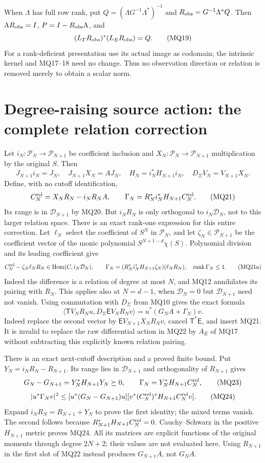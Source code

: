 \documentclass[11pt]{article}
\newcommand{\DD}{\mathcal D}
\newcommand{\TT}{\mathsf T}
\newcommand{\EE}{\mathsf E}
\begin{document}
When $\Lambda$ has full row rank, put
$Q=(\Lambda G^{-1}\Lambda^*)^{-1}$ and
$R_{\rm obs}=G^{-1}\Lambda^*Q$. Then
$\Lambda R_{\rm obs}=I$, $P=I-R_{\rm obs}\Lambda$, and
\[
 (L_TR_{\rm obs})^*(L_ER_{\rm obs})=Q.                      \tag{MQ19}
\]
For a rank-deficient presentation use its actual image as codomain;
the intrinsic kernel and MQ17--18 need no change. Thus no observation
direction or relation is removed merely to obtain a scalar norm.

\section{Degree-raising source action: the complete relation correction}
Let $i_N:\mathcal P_N\to\mathcal P_{N+1}$ be coefficient inclusion
and $X_N:\mathcal P_N\to\mathcal P_{N+1}$ multiplication by the
original $S$. Then
\[
 J_{N+1}i_N=J_N,\quad J_{N+1}X_N=AJ_N,\quad
 H_N=i_N^*H_{N+1}i_N,\quad D_\Sigma V_N=V_{N+1}X_N.         \tag{MQ20}
\]
Define, with no cutoff identification,
\[
 C_N^{\rm rel}=X_NR_N-i_NR_NA,\qquad
 \Gamma_N=R_N^*i_N^*H_{N+1}C_N^{\rm rel}.                  \tag{MQ21}
\]
Its range is in $\DD_{N+1}$ by MQ20. But $i_NR_N$ is only
orthogonal to $i_N\DD_N$, not to this larger relation space.
There is an exact rank-one expression for this entire correction.
Let $\ell_N$ select the coefficient of $S^N$ in $\mathcal P_N$,
and let $\zeta_N\in\mathcal P_{N+1}$ be the coefficient vector
of the monic polynomial $S^{N+1-d}\chi(S)$. Polynomial division
and its leading coefficient give
\[
 C_N^{\rm rel}-\zeta_N\ell_NR_N\in
       \operatorname{Hom}(C,i_N\DD_N),\qquad
 \Gamma_N=(R_N^*i_N^*H_{N+1}\zeta_N)(\ell_NR_N),\quad
 \operatorname{rank}\Gamma_N\le1.                          \tag{MQ21a}
\]
Indeed the difference is a relation of degree at most $N$, and
MQ12 annihilates its pairing with $R_N$. This applies also at
$N=d-1$, when $\DD_N=0$ but $\DD_{N+1}$ need not vanish.
Using commutation with $D_\Sigma$ from MQ10 gives the exact formula
\[
 \langle\TT V_NR_Nu,D_\Sigma\EE V_NR_Nv\rangle
       =u^*(G_NA+\Gamma_N)v.                               \tag{MQ22}
\]
Indeed replace the second vector by $\EE V_{N+1}X_NR_Nv$,
cancel $\TT^*\EE$, and insert MQ21. It is invalid to replace
the raw differential action in MQ22 by $A_E$ of MQ17 without
subtracting this explicitly known relation pairing.

There is an exact next-cutoff description and a proved finite bound.
Put $Y_N=i_NR_N-R_{N+1}$. Its range lies in $\DD_{N+1}$ and
orthogonality of $R_{N+1}$ gives
\[
 G_N-G_{N+1}=Y_N^*H_{N+1}Y_N\succeq0,\qquad
 \Gamma_N=Y_N^*H_{N+1}C_N^{\rm rel},                       \tag{MQ23}
\]
\[
 |u^*\Gamma_Nv|^2\le
   [u^*(G_N-G_{N+1})u]
   [v^*(C_N^{\rm rel})^*H_{N+1}C_N^{\rm rel}v].             \tag{MQ24}
\]
Expand $i_NR_N=R_{N+1}+Y_N$ to prove the first identity;
the mixed terms vanish. The second follows because
$R_{N+1}^*H_{N+1}C_N^{\rm rel}=0$. Cauchy--Schwarz in the
positive $H_{N+1}$ metric proves MQ24. All its matrices are
explicit functions of the original moments through degree $2N+2$;
their values are not evaluated here. Using $R_{N+1}$ in the first
slot of MQ22 instead produces $G_{N+1}A$, not $G_NA$.
\end{document}
